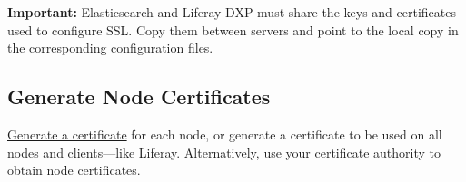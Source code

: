 \noindent\hrulefill

\textbf{Important:} Elasticsearch and Liferay DXP must share the keys
and certificates used to configure SSL. Copy them between servers and
point to the local copy in the corresponding configuration files.

\noindent\hrulefill

\subsection{Generate Node
Certificates}\label{generate-node-certificates}

\href{https://www.elastic.co/guide/en/elasticsearch/reference/7.x/configuring-tls.html\#node-certificates}{Generate
a certificate} for each node, or generate a certificate to be used on
all nodes and clients---like Liferay. Alternatively, use your
certificate authority to obtain node certificates.

